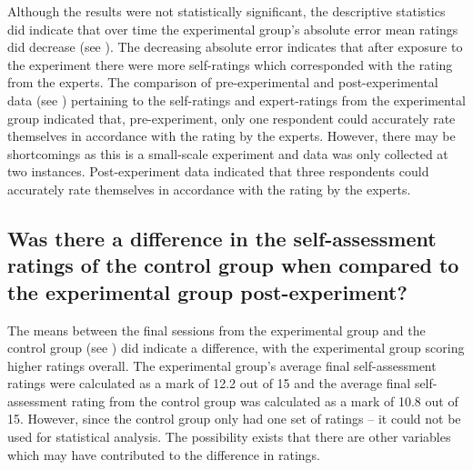 \documentclass[output=paper]{langsci/langscibook}
\begin{document}
Although the results were not statistically significant, the descriptive statistics did indicate that over time the experimental group’s absolute error mean ratings did decrease (see ). The decreasing absolute error indicates that after exposure to the experiment there were more self-ratings which corresponded with the rating from the experts. The comparison of pre-experimental and post-experimental data (see ) pertaining to the self-ratings and expert-ratings from the experimental group indicated that, pre-experiment, only one respondent could accurately rate themselves in accordance with the rating by the experts. However, there may be shortcomings as this is a small-scale experiment and data was only collected at two instances. Post-experiment data indicated that three respondents could accurately rate themselves in accordance with the rating by the experts.

\subsection{Was there a difference in the self-assessment ratings of the control group when compared to the experimental group post-experiment?}

The means between the final sessions from the experimental group and the control group (see ) did indicate a difference, with the experimental group scoring higher ratings overall. The experimental group’s average final self-assess\-ment ratings were calculated as a mark of 12.2 out of 15 and the average final self-assessment rating from the control group was calculated as a mark of 10.8 out of 15. However, since the control group only had one set of ratings – it could not be used for statistical analysis. The possibility exists that there are other variables which may have contributed to the difference in ratings. 
\end{document}
